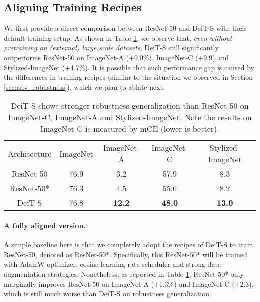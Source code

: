 \documentclass{article}
\begin{document}
\subsection{Aligning Training Recipes}
\label{sec:gene:align}
We first provide a direct comparison between ResNet-50 and DeiT-S with their default training setup. As shown in Table \ref{exp:orisetting}, we observe that, \emph{even without pretraining on (external) large scale datasets},  DeiT-S still significantly outperforms ResNet-50 on ImageNet-A (+9.0\%), ImageNet-C (+9.9) and Stylized-ImageNet (+4.7\%). It is possible that such performance gap is caused by the differences in training recipes (similar to the situation we observed in Section \ref{sec:adv_robustness}), 
which we plan to ablate next.


\begin{table}[h!]
\vspace{-0.3em}
\caption{DeiT-S shows stronger robustness generalization than ResNet-50 on ImageNet-C, ImageNet-A and Stylized-ImageNet. Note the results on ImageNet-C is measured by mCE (lower is better). }
\footnotesize
\centering
\begin{tabular}{c|c|c|c|c}
\shline
 Architecture & ImageNet \textcolor{red}{} & ImageNet-A \textcolor{red}{}& ImageNet-C \textcolor{red}{}& Stylized-ImageNet \textcolor{red}{} \\ \shline 
ResNet-50  &  76.9        &   3.2        &    57.9       &    8.3     \\ 

 ResNet-50*  &   76.3     &    4.5        &     55.6       &      8.2     \\ \hline 
 DeiT-S &  76.8        &   \textbf{12.2}         &     \textbf{48.0}       &   \textbf{13.0}    \\ \hline 
\end{tabular}
\label{exp:orisetting}
\vspace{-0.2em}
\end{table}



\paragraph{A fully aligned version.}
A simple baseline here is that we completely adopt the recipes of DeiT-S to train ResNet-50, denoted as ResNet-50*. Specifically, this ResNet-50* will be trained with AdamW optimizer, cosine learning rate scheduler and strong data augmentation strategies. Nonetheless, as reported in Table \ref{exp:orisetting}, ResNet-50* only marginally improves ResNet-50 on ImageNet-A (+1.3\%) and ImageNet-C (+2.3), which is still much worse than DeiT-S on robustness generalization.
\end{document}
